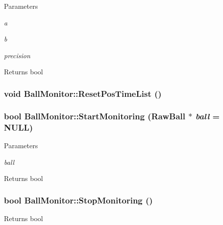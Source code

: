 \begin{DoxyParams}{Parameters}
\item[{\em a}]\item[{\em b}]\item[{\em precision}]\end{DoxyParams}
\begin{DoxyReturn}{Returns}
bool 
\end{DoxyReturn}
\hypertarget{classBallMonitor_a09ed61cf1852d45f03e7aacdebfe0175}{
\subsubsection[{ResetPosTimeList}]{\setlength{\rightskip}{0pt plus 5cm}void BallMonitor::ResetPosTimeList ()}}
\label{classBallMonitor_a09ed61cf1852d45f03e7aacdebfe0175}
\hypertarget{classBallMonitor_a4d2b3aa764f5d4f4d5f58b7530565f90}{
\subsubsection[{StartMonitoring}]{\setlength{\rightskip}{0pt plus 5cm}bool BallMonitor::StartMonitoring (RawBall $\ast$ {\em ball} = {\ttfamily NULL})}}
\label{classBallMonitor_a4d2b3aa764f5d4f4d5f58b7530565f90}

\begin{DoxyParams}{Parameters}
\item[{\em ball}]\end{DoxyParams}
\begin{DoxyReturn}{Returns}
bool 
\end{DoxyReturn}
\hypertarget{classBallMonitor_af71db12abeb1f10f7be58eb7591910a3}{
\subsubsection[{StopMonitoring}]{\setlength{\rightskip}{0pt plus 5cm}bool BallMonitor::StopMonitoring ()}}
\label{classBallMonitor_af71db12abeb1f10f7be58eb7591910a3}
\begin{DoxyReturn}{Returns}
bool 
\end{DoxyReturn}


